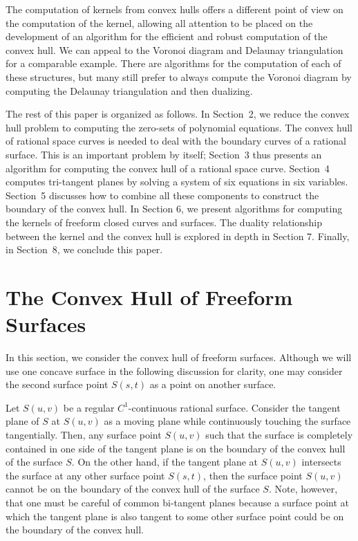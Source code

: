 \documentclass[doublespacing]{elsart}
\begin{document}
The computation of kernels from convex hulls offers a different point of
view on the computation of the kernel, allowing all attention
to be placed on the development of an algorithm
for the efficient and robust computation of the convex hull.
We can appeal to the Voronoi diagram and Delaunay triangulation
for a comparable example.  There are algorithms for the computation of
each of these structures, but many still prefer to always compute
the Voronoi diagram by computing the Delaunay triangulation and then dualizing.

The rest of this paper is organized as follows.
In Section~2, we reduce the convex hull problem to
computing the zero-sets of polynomial equations.
The convex hull of rational space curves is needed
to deal with the boundary curves of a rational surface.
This is an important problem by itself;
Section~3 thus presents an algorithm for computing
the convex hull of a rational space curve.
Section~4 computes tri-tangent planes by solving
a system of six equations in six variables.  
Section~5 discusses how to combine all these components
to construct the boundary of the convex hull.
In Section 6, we present algorithms for computing the kernels
of freeform closed curves and surfaces.
The duality relationship between the kernel and the convex hull
is explored in depth in Section 7.
Finally, in Section~8, we conclude this paper.

\section{The Convex Hull of Freeform Surfaces}
\label{sec-ch-surface}

In this section, we consider the convex hull of freeform surfaces.
Although we will use one concave surface in the following discussion
for clarity,  one may consider the second surface point $S(s,t)$
as a point on another surface.

Let $S(u,v)$ be a regular $C^1$-continuous rational surface. 
Consider the tangent plane of $S$ at $S(u,v)$ as a moving plane
while continuously touching the surface tangentially.
Then, any surface point $S(u,v)$
such that the surface is completely contained in one side of
the tangent plane is on the boundary of the convex hull of
the surface $S$. On the other hand, if the tangent plane at $S(u,v)$ 
intersects the surface at any other surface point $S(s,t)$, then
the surface point $S(u,v)$ cannot be on the boundary of
the convex hull of the surface $S$.
Note, however, that one must be careful of common bi-tangent planes because 
a surface point at which the tangent plane is also tangent to some
other surface point could be on the boundary of the convex hull. 
\end{document}
